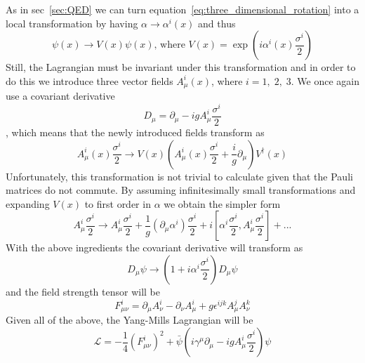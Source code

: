 As in sec~\ref{sec:QED} we can turn equation~\ref{eq:three_dimensional_rotation} into a local transformation by having $\alpha\rightarrow\alpha^{i}\left(x\right)$ and thus
\begin{equation}
	\psi\left(x\right){\rightarrow}V\left(x\right)\psi\left(x\right)\text{, where }V\left(x\right)=\exp\left(i\alpha^{i}\left(x\right)\frac{\sigma^{i}}{2}\right)
\end{equation}
Still, the Lagrangian must be invariant under this transformation and in order to do this we introduce three vector fields $A_{\mu}^{i}\left(x\right)$, where $i=1,\;2,\;3$.
We once again use a covariant derivative
\begin{equation}
	D_{\mu}=\partial_{\mu}-igA_{\mu}^{i}\frac{\sigma^{i}}{2}
\end{equation}
, which means that the newly introduced fields transform as
\begin{equation}
	A_{\mu}^{i}\left(x\right)\frac{\sigma^{i}}{2}{\rightarrow}V\left(x\right)\left(A_{\mu}^{i}\left(x\right)\frac{\sigma^{i}}{2}+\frac{i}{g}\partial_{\mu}\right)V^{\dagger}\left(x\right)
\end{equation}
Unfortunately, this transformation is not trivial to calculate given that the Pauli matrices do not commute.
By assuming infinitesimally small transformations and expanding $V\left(x\right)$ to first order in $\alpha$ we obtain the simpler form
\begin{equation}
A_{\mu}^{i}\frac{\sigma^{i}}{2}{\rightarrow}A_{\mu}^{i}\frac{\sigma^{i}}{2}+\frac{1}{g}\left(\partial_{\mu}\alpha^{i}\right)\frac{\sigma^{i}}{2}+i\left[\alpha^{i}\frac{\sigma^{i}}{2},A_{\mu}^{i}\frac{\sigma^{i}}{2}\right]+...
\end{equation}
With the above ingredients the covariant derivative will transform as
\begin{equation}
	D_{\mu}\psi{\rightarrow}\left(1+i\alpha^{i}\frac{\sigma^{i}}{2}\right)D_{\mu}\psi
\end{equation}
and the field strength tensor will be
\begin{equation}
	F_{\mu\nu}^{i}=\partial_{\mu}A_{\nu}^{i}-\partial_{\nu}A_{\mu}^{i}+g\epsilon^{ijk}A_{\mu}^{j}A_{\nu}^{k}
\end{equation}
Given all of the above, the Yang-Mills Lagrangian will be
\begin{equation}\label{eq:yang_mills_lagrangian}
	\mathcal{L}=-\frac{1}{4}\left(F_{\mu\nu}^{i}\right)^{2}+\bar{\psi}\left(i\gamma^{\mu}\partial_{\mu}-igA_{\mu}^{i}\frac{\sigma^{i}}{2}\right)\psi
\end{equation}

